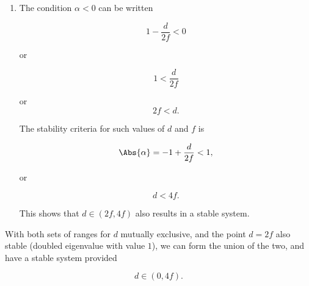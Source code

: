 {\begin{enumerate}
or
\begin{dmath}\label{eqn:problemSet4Problem4:580}
d < 2 f.
\end{dmath}

For these positive values of $\alpha$ we have

\begin{dmath}\label{eqn:problemSet4Problem4:440}
1 - \frac{d}{2f} < 1
\end{dmath}

or
\begin{dmath}\label{eqn:problemSet4Problem4:600}
\frac{d}{2f} > 0,
\end{dmath}

which just means that $d$ is positive.  This shows that $d \in (0, 2f)$ results in a stable system.

\item The condition $\alpha < 0$ can be written

\begin{dmath}\label{eqn:problemSet4Problem4:460}
1 - \frac{d}{2f} < 0
\end{dmath}

or

\begin{dmath}\label{eqn:problemSet4Problem4:480}
1 < \frac{d}{2f}
\end{dmath}

or
\begin{dmath}\label{eqn:problemSet4Problem4:500}
2f < d.
\end{dmath}

The stability criteria for such values of $d$ and $f$ is 

\begin{dmath}\label{eqn:problemSet4Problem4:520}
\Abs{\alpha} = -1 + \frac{d}{2f} < 1,
\end{dmath}

or

\begin{dmath}\label{eqn:problemSet4Problem4:540}
d < 4 f.
\end{dmath}

This shows that $d \in (2 f, 4 f)$ also results in a stable system.
\end{enumerate}

With both sets of ranges for $d$ mutually exclusive, and the point $d = 2f$ also stable (doubled eigenvalue with value $1$), we can form the union of the two, and have a stable system provided

\begin{dmath}\label{eqn:problemSet4Problem4:620}
d \in (0, 4 f).
\end{dmath}

}
